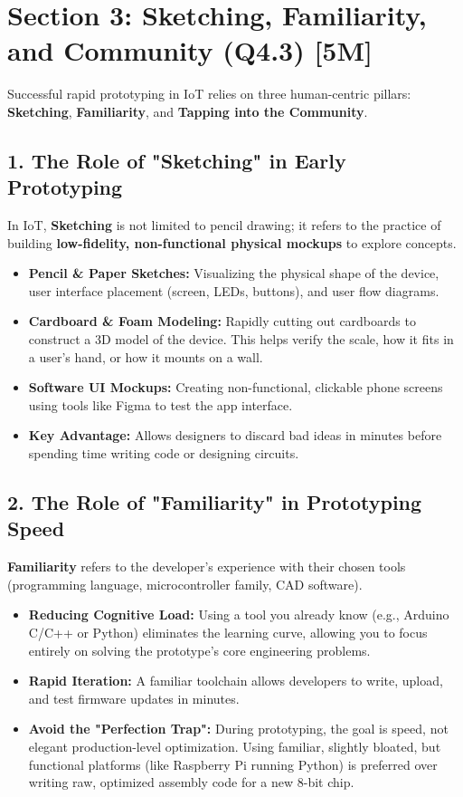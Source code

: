 \section{Section 3: Sketching, Familiarity, and Community (Q4.3) [5M]}

Successful rapid prototyping in IoT relies on three human-centric pillars: \textbf{Sketching}, \textbf{Familiarity}, and \textbf{Tapping into the Community}.


\subsection{1. The Role of "Sketching" in Early Prototyping}
In IoT, \textbf{Sketching} is not limited to pencil drawing; it refers to the practice of building \textbf{low-fidelity, non-functional physical mockups} to explore concepts.
\begin{itemize}
  \item   \textbf{Pencil \& Paper Sketches:} Visualizing the physical shape of the device, user interface placement (screen, LEDs, buttons), and user flow diagrams.
  \item   \textbf{Cardboard \& Foam Modeling:} Rapidly cutting out cardboards to construct a 3D model of the device. This helps verify the scale, how it fits in a user’s hand, or how it mounts on a wall.
  \item   \textbf{Software UI Mockups:} Creating non-functional, clickable phone screens using tools like Figma to test the app interface.
  \item   \textbf{Key Advantage:} Allows designers to discard bad ideas in minutes before spending time writing code or designing circuits.
\end{itemize}


\subsection{2. The Role of "Familiarity" in Prototyping Speed}
\textbf{Familiarity} refers to the developer's experience with their chosen tools (programming language, microcontroller family, CAD software).
\begin{itemize}
  \item   \textbf{Reducing Cognitive Load:} Using a tool you already know (e.g., Arduino C/C++ or Python) eliminates the learning curve, allowing you to focus entirely on solving the prototype's core engineering problems.
  \item   \textbf{Rapid Iteration:} A familiar toolchain allows developers to write, upload, and test firmware updates in minutes.
  \item   \textbf{Avoid the "Perfection Trap":} During prototyping, the goal is speed, not elegant production-level optimization. Using familiar, slightly bloated, but functional platforms (like Raspberry Pi running Python) is preferred over writing raw, optimized assembly code for a new 8-bit chip.
\end{itemize}


